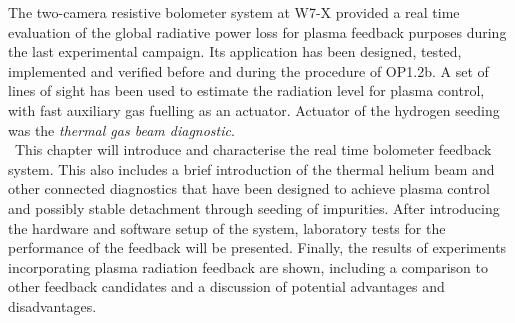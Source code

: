     The two-camera resistive bolometer system at W7-X provided a real time evaluation of the global radiative power loss for plasma feedback purposes during the last experimental campaign. Its application has been designed, tested, implemented and verified before and during the procedure of OP1.2b. A set of lines of sight has been used to estimate the radiation level for plasma control, with fast auxiliary gas fuelling as an actuator. Actuator of the hydrogen seeding was the \textit{thermal gas beam diagnostic}\cite{Krychowiak2011}.\\%
    \,\newline%
    This chapter will introduce and characterise the real time bolometer feedback system. This also includes a brief introduction of the thermal helium beam and other connected diagnostics that have been designed to achieve plasma control and possibly stable detachment through seeding of impurities. After introducing the hardware and software setup of the system, laboratory tests for the performance of the feedback will be presented. Finally, the results of experiments incorporating plasma radiation feedback are shown, including a comparison to other feedback candidates and a discussion of potential advantages and disadvantages.%
%
